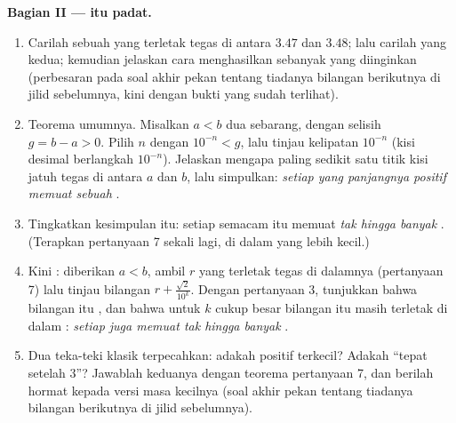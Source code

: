 \begin{problem}
\medskip
\noindent\textbf{Bagian II ---  itu padat.}
\begin{enumerate}[resume]
  \item Carilah sebuah  yang terletak tegas di antara
        $3.47$ dan $3.48$; lalu carilah yang kedua; kemudian jelaskan cara
        menghasilkan sebanyak yang diinginkan (perbesaran pada soal akhir
        pekan tentang tiadanya bilangan berikutnya di jilid sebelumnya, kini
        dengan bukti yang sudah terlihat).
  \item Teorema umumnya. Misalkan $a < b$ dua  sebarang, dengan
        selisih $g = b - a > 0$. Pilih $n$ dengan
        $10^{-n} < g$, lalu tinjau kelipatan $10^{-n}$
        (kisi desimal berlangkah $10^{-n}$). Jelaskan mengapa paling
        sedikit satu titik kisi jatuh tegas di antara $a$ dan $b$,
        lalu simpulkan: \emph{setiap  yang panjangnya positif
        memuat sebuah }.
  \item Tingkatkan kesimpulan itu: setiap  semacam itu memuat
        \emph{tak hingga banyak} . (Terapkan pertanyaan 7
        sekali lagi, di dalam  yang lebih kecil.)
  \item Kini : diberikan $a < b$, ambil 
        $r$ yang terletak tegas di dalamnya (pertanyaan 7) lalu tinjau
        bilangan $r + \frac{\sqrt2}{10^k}$. Dengan pertanyaan 3, tunjukkan
        bahwa bilangan itu , dan bahwa untuk $k$ cukup besar
        bilangan itu masih terletak di dalam : \emph{setiap 
        juga memuat tak hingga banyak }.
  \item Dua teka-teki klasik terpecahkan: adakah  positif
        terkecil? Adakah  ``tepat setelah
        $3$''? Jawablah keduanya dengan teorema pertanyaan 7, dan
        berilah hormat kepada versi masa kecilnya (soal akhir pekan tentang
        tiadanya bilangan berikutnya di jilid sebelumnya).
\end{enumerate}


\end{problem}
